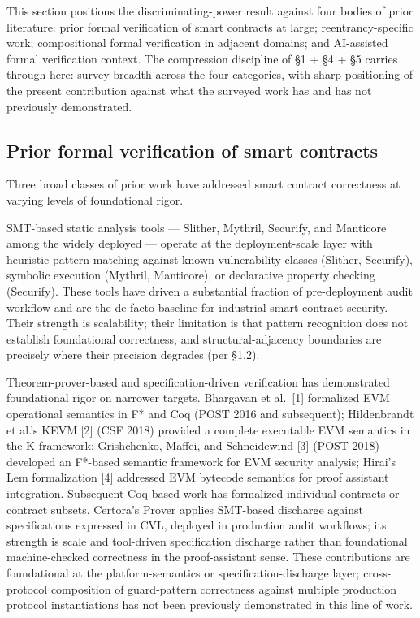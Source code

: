 This section positions the discriminating-power result against four
bodies of prior literature: prior formal verification of smart contracts
at large; reentrancy-specific work; compositional formal verification in
adjacent domains; and AI-assisted formal verification context. The
compression discipline of §1 + §4 + §5 carries through here: survey
breadth across the four categories, with sharp positioning of the
present contribution against what the surveyed work has and has not
previously demonstrated.

\subsection{Prior formal verification of smart
contracts}\label{prior-formal-verification-of-smart-contracts}

Three broad classes of prior work have addressed smart contract
correctness at varying levels of foundational rigor.

SMT-based static analysis tools --- Slither, Mythril, Securify, and
Manticore among the widely deployed --- operate at the deployment-scale
layer with heuristic pattern-matching against known vulnerability
classes (Slither, Securify), symbolic execution (Mythril, Manticore), or
declarative property checking (Securify). These tools have driven a
substantial fraction of pre-deployment audit workflow and are the de
facto baseline for industrial smart contract security. Their strength is
scalability; their limitation is that pattern recognition does not
establish foundational correctness, and structural-adjacency boundaries
are precisely where their precision degrades (per §1.2).

Theorem-prover-based and specification-driven verification has
demonstrated foundational rigor on narrower targets. Bhargavan et
al.~{[}1{]} formalized EVM operational semantics in F* and Coq (POST
2016 and subsequent); Hildenbrandt et al.'s KEVM {[}2{]} (CSF 2018)
provided a complete executable EVM semantics in the K framework;
Grishchenko, Maffei, and Schneidewind {[}3{]} (POST 2018) developed an
F*-based semantic framework for EVM security analysis; Hirai's Lem
formalization {[}4{]} addressed EVM bytecode semantics for proof
assistant integration. Subsequent Coq-based work has formalized
individual contracts or contract subsets. Certora's Prover applies
SMT-based discharge against specifications expressed in CVL, deployed in
production audit workflows; its strength is scale and tool-driven
specification discharge rather than foundational machine-checked
correctness in the proof-assistant sense. These contributions are
foundational at the platform-semantics or specification-discharge layer;
cross-protocol composition of guard-pattern correctness against multiple
production protocol instantiations has not been previously demonstrated
in this line of work.

